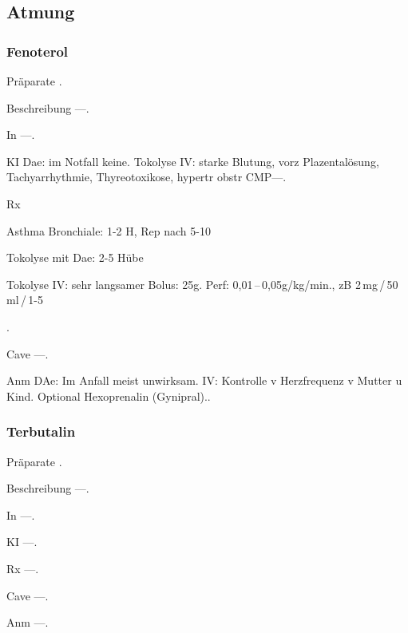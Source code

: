 \subsection{Atmung}

\subsubsection{Fenoterol}

\begin{labeling}[:]{mm}
  \item[Präparate] .
  \item[Beschreibung] ---.
  \item[In] ---.
  \item[KI]  Dae: im Notfall keine. Tokolyse IV: starke Blutung, vorz
  Plazentalösung, Tachyarrhythmie, Thyreotoxikose, hypertr obstr CMP---.
  \item[Rx]
  \begin{inparaitem}
  \item Asthma Bronchiale: 1-2 H, Rep nach 5-10{\textquotesingle}
  \item Tokolyse mit Dae: 2-5 Hübe
  \item Tokolyse IV: sehr langsamer Bolus: 25{\textmu}g. 
  Perf: 0,01\,--\,0,05{\textmu}g/kg/min., zB 2\,mg\,/\,50\,ml\,/\,1-5
  \end{inparaitem}.
  \item[Cave] ---.
  \item[Anm] DAe: Im Anfall meist unwirksam. IV: Kontrolle v Herzfrequenz v Mutter u
  Kind. Optional Hexoprenalin (Gynipral)..
\end{labeling}



\subsubsection{Terbutalin}

\begin{labeling}[:]{mm}
  \item[Präparate]  .
  \item[Beschreibung] ---.
  \item[In] ---.
  \item[KI] ---.
  \item[Rx] ---.
  \item[Cave] ---.
  \item[Anm] ---.
\end{labeling}



